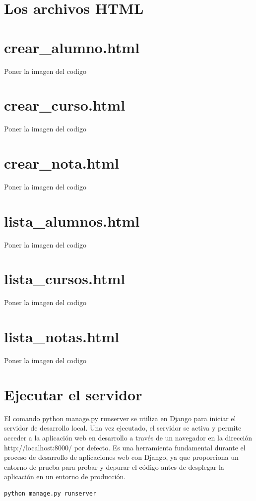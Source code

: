 \documentclass[10pt, a4paper]{article}
\begin{document}
\section{Los archivos HTML}

\section{crear\_alumno.html }
\singlespacing
Poner la imagen del codigo 

\section{crear\_curso.html }
\singlespacing
Poner la imagen del codigo 

\section{crear\_nota.html }
\singlespacing
Poner la imagen del codigo 

\section{lista\_alumnos.html }
\singlespacing
Poner la imagen del codigo 

\section{lista\_cursos.html }
\singlespacing
Poner la imagen del codigo 

\section{lista\_notas.html }
\singlespacing
Poner la imagen del codigo 

\section{Ejecutar el servidor}
El comando python manage.py runserver se utiliza en Django para iniciar el servidor de desarrollo local. Una vez ejecutado, el servidor se activa y permite acceder a la aplicación web en desarrollo a través de un navegador en la dirección http://localhost:8000/ por defecto. Es una herramienta fundamental durante el proceso de desarrollo de aplicaciones web con Django, ya que proporciona un entorno de prueba para probar y depurar el código antes de desplegar la aplicación en un entorno de producción.
\begin{lstlisting}[language=bash]
  python manage.py runserver
\end{lstlisting}
\end{document}
